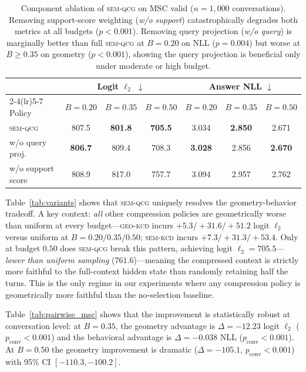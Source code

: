 \documentclass[11pt]{article}
\newcommand{\semqcg}{\textsc{sem-qcg}}
\newcommand{\geokcd}{\textsc{geo-kcd}}
\newcommand{\semkcd}{\textsc{sem-kcd}}
\begin{document}
\begin{table}[t]
\centering
\caption{Component ablation of \semqcg{} on MSC valid ($n{=}1{,}000$ conversations).
Removing support-score weighting (\textit{w/o support}) catastrophically degrades both metrics
at all budgets ($p{<}0.001$). Removing query projection (\textit{w/o query}) is marginally
better than full \semqcg{} at $B{=}0.20$ on NLL ($p{=}0.004$) but worse at $B{\geq}0.35$
on geometry ($p{<}0.001$), showing the query projection is beneficial only under moderate
or high budget.}
\label{tab:msc_ablation}
\setlength{\tabcolsep}{5pt}
\begin{tabular}{lcccccc}
\toprule
& \multicolumn{3}{c}{Logit $\ell_2$ $\downarrow$} & \multicolumn{3}{c}{Answer NLL $\downarrow$} \\
\cmidrule(lr){2-4}\cmidrule(lr){5-7}
Policy & $B{=}0.20$ & $B{=}0.35$ & $B{=}0.50$ & $B{=}0.20$ & $B{=}0.35$ & $B{=}0.50$ \\
\midrule
\semqcg{} & 807.5 & \textbf{801.8} & \textbf{705.5} & 3.034 & \textbf{2.850} & 2.671 \\
\quad w/o query proj. & \textbf{806.7} & 809.4 & 708.3 & \textbf{3.028} & 2.856 & \textbf{2.670} \\
\quad w/o support score & 808.9 & 817.0 & 757.7 & 3.094 & 2.957 & 2.762 \\
\bottomrule
\end{tabular}
\end{table}

Table~\ref{tab:variants} shows that \semqcg{} uniquely resolves the
geometry-behavior tradeoff.
A key context: \emph{all} other compression policies are geometrically worse than
uniform at every budget---\geokcd{} incurs $+5.3/+31.6/+51.2$ logit $\ell_2$
versus uniform at $B{=}0.20/0.35/0.50$; \semkcd{} incurs $+7.3/+31.3/+53.4$.
Only at budget $0.50$ does \semqcg{} break this pattern, achieving logit
$\ell_2 = 705.5$---\emph{lower than uniform sampling} ($761.6$)---meaning the
compressed context is strictly more faithful to the full-context hidden state
than randomly retaining half the turns.
This is the only regime in our experiments where any compression policy
is geometrically more faithful than the no-selection baseline.

Table~\ref{tab:pairwise_msc} shows that the improvement is statistically
robust at conversation level: at $B{=}0.35$, the geometry advantage is
$\Delta{=}{-}12.23$ logit $\ell_2$ ($p_\text{conv} < 0.001$) and the behavioral
advantage is $\Delta{=}{-}0.038$ NLL ($p_\text{conv} < 0.001$).
At $B{=}0.50$ the geometry improvement is dramatic
($\Delta{=}{-}105.1$, $p_\text{conv} < 0.001$)
with 95\% CI $[-110.3, -100.2]$.
\end{document}
